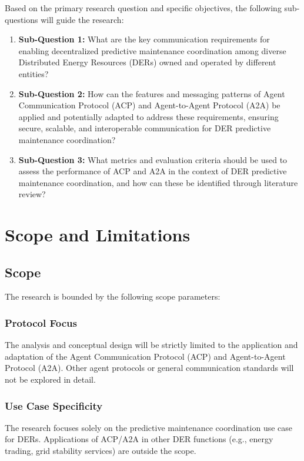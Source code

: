 \documentclass[12pt,a4paper]{article}
\begin{document}
Based on the primary research question and specific objectives, the following sub-questions will guide the research:

\begin{enumerate}
    \item \textbf{Sub-Question 1:} What are the key communication requirements for enabling decentralized predictive maintenance coordination among diverse Distributed Energy Resources (DERs) owned and operated by different entities?
    
    \item \textbf{Sub-Question 2:} How can the features and messaging patterns of Agent Communication Protocol (ACP) and Agent-to-Agent Protocol (A2A) be applied and potentially adapted to address these requirements, ensuring secure, scalable, and interoperable communication for DER predictive maintenance coordination?
    
    \item \textbf{Sub-Question 3:} What metrics and evaluation criteria should be used to assess the performance of ACP and A2A in the context of DER predictive maintenance coordination, and how can these be identified through literature review?
\end{enumerate}

\section{Scope and Limitations}
\label{sec:scope}

\subsection{Scope}

The research is bounded by the following scope parameters:

\subsubsection{Protocol Focus}
The analysis and conceptual design will be strictly limited to the application and adaptation of the Agent Communication Protocol (ACP) and Agent-to-Agent Protocol (A2A). Other agent protocols or general communication standards will not be explored in detail.

\subsubsection{Use Case Specificity}
The research focuses solely on the predictive maintenance coordination use case for DERs. Applications of ACP/A2A in other DER functions (e.g., energy trading, grid stability services) are outside the scope.
\end{document}
